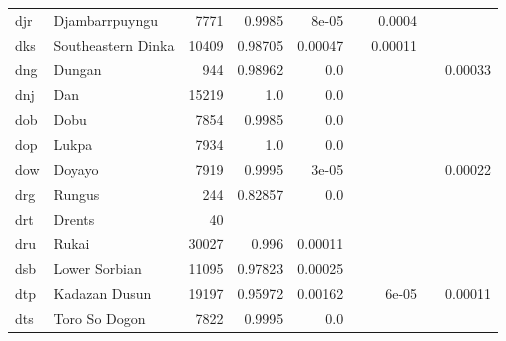 \documentclass[11pt]{article}
\begin{document}
\begin{table*}[h]
{\begin{tabular}{llrrrrrrr}
djr         & Djambarrpuyngu         & 7771         & 0.9985         & 8e-05         &          & 0.0004         &          &          \\

dks         & Southeastern Dinka         & 10409         & 0.98705         & 0.00047         &          & 0.00011         &          &          \\

dng         & Dungan         & 944         & 0.98962         & 0.0         &          &          &          & 0.00033         \\

dnj         & Dan         & 15219         & 1.0         & 0.0         &          &          &          &          \\

dob         & Dobu         & 7854         & 0.9985         & 0.0         &          &          &          &          \\

dop         & Lukpa         & 7934         & 1.0         & 0.0         &          &          &          &          \\

dow         & Doyayo         & 7919         & 0.9995         & 3e-05         &          &          &          & 0.00022         \\

drg         & Rungus         & 244         & 0.82857         & 0.0         &          &          &          &          \\

drt         & Drents         & 40         &          &          &          &          &          &          \\

dru         & Rukai         & 30027         & 0.996         & 0.00011         &          &          &          &          \\

dsb         & Lower Sorbian         & 11095         & 0.97823         & 0.00025         &          &          &          &          \\

dtp         & Kadazan Dusun         & 19197         & 0.95972         & 0.00162         &          & 6e-05         &          & 0.00011         \\

dts         & Toro So Dogon         & 7822         & 0.9995         & 0.0         &          &          &          &          \\


\end{tabular}}
\end{table*}
\end{document}
